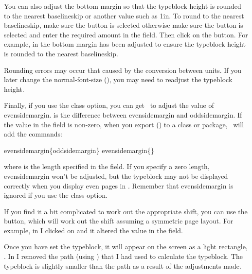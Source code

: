 You can also adjust the bottom margin so that the \gls{typeblock} height
is rounded to the nearest baselineskip or another value such as 1in.
To round to the nearest baselineskip, make sure the
 button is selected otherwise
make sure the  button is
selected and enter the required amount in the field. Then click on
the  button. For example, in
 the bottom margin has been adjusted to
ensure the \gls{typeblock} height is rounded to the nearest baselineskip.

\begin{warning}
Rounding errors may occur that caused by the conversion between
units. If you later change the \gls{normal-font-size}
(),
you may need to readjust the \gls{typeblock} height.
\end{warning}

Finally, if you use the  class option, you can get
\FlowframTk\ to adjust the value of \gls{evensidemargin}.
 is the difference between
\gls{evensidemargin} and \gls{oddsidemargin}. If the value
in the  field is non-zero, when you
export () to a class or package, 
\FlowframTk\ will add the commands:
\begin{compactcodebox}
\gls{evensidemargin}\{\gls{oddsidemargin}\}
\gls{evensidemargin}\{\}
\end{compactcodebox}%
where  is the length specified in the
 field. If you specify a zero
length, \gls{evensidemargin} won't be adjusted, but the
typeblock may not be displayed correctly when you display even
pages in \FlowframTk. Remember that \gls{evensidemargin} is
ignored if you use the  class option.


If you find it a bit complicated to work out the appropriate shift,
you can use the  button,
which will work out the shift assuming a symmetric page layout. For
example, in  I clicked on
 and it altered the
value in the  field.

Once you have set the \gls{typeblock}, it will appear on the screen as
a light  rectangle,  . In
 I removed the \gls{path} (using
) that I had used to calculate the \gls{typeblock}. The
\gls{typeblock} is slightly smaller than the \gls*{path} as a result of
the adjustments made.


